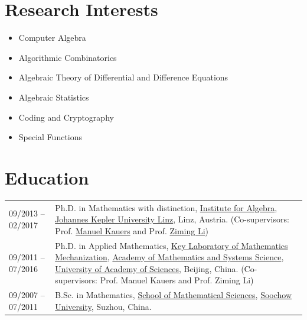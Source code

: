 \documentclass[a4paper,12pt]{article}
\begin{document}
\section*{\Large{Research Interests}}
\begin{itemize}
\item  Computer Algebra
\item Algorithmic Combinatorics
\item Algebraic Theory of Differential and Difference Equations
\item Algebraic Statistics
\item Coding and Cryptography
\item Special Functions
\end{itemize}

\section*{\Large{Education}}
\begin{tabular}{@{}p{1.4in}p{4in}}
09/2013 -- 02/2017    & Ph.D. in Mathematics with distinction, 
                        \href{http://www.jku.at/algebra/content}{Institute for Algebra}, 
                        \href{http://www.jku.at/content}{Johannes Kepler University Linz}, Linz, Austria. 
                        (Co-supervisors: Prof. \href{http://www.kauers.de/}{Manuel Kauers} and 
                        Prof. \href{http://mmrc.iss.ac.cn/~zmli/}{Ziming Li})\\
09/2011 -- 07/2016    & Ph.D. in Applied Mathematics, 
                        \href{http://english.mmrc.amss.cas.cn/}{Key Laboratory of Mathematics Mechanization}, 
                        \href{http://english.amss.cas.cn/}{Academy of Mathematics and Systems Science}, 
                        \href{http://english.ucas.ac.cn/}{University of Academy of Sciences}, Beijing, China. 
                        (Co-supervisors: Prof. Manuel Kauers and Prof. Ziming Li)\\
09/2007 -- 07/2011    & B.Sc. in Mathematics, \href{http://math.suda.edu.cn/}{School of Mathematical Sciences}, 
                        \href{http://eng.suda.edu.cn/}{Soochow University}, Suzhou, China.  
\end{tabular} \\
\end{document}

